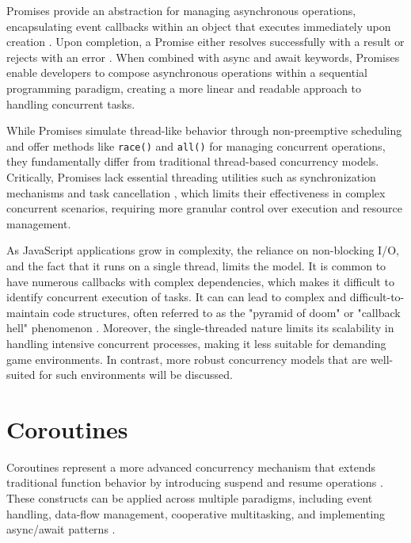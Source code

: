 \documentclass[]{final}
\begin{document}
Promises provide an abstraction for managing asynchronous operations,
encapsulating event callbacks within an object that executes
immediately upon creation \cite{zhao_concurrency_2021}.
Upon completion, a Promise either
resolves successfully with a result or rejects with an error
\cite{zhao_concurrency_2021}. When combined with async and await
keywords, Promises enable
developers to compose asynchronous operations within a
sequential programming paradigm, creating a more linear and
readable approach to handling concurrent tasks.

While Promises simulate thread-like behavior through non-preemptive scheduling
and offer methods like \lstinline|race()| and \lstinline|all()| for managing concurrent operations,
\cite{noauthor_event_2024} they fundamentally differ from traditional thread-based
concurrency models.
Critically, Promises lack essential threading utilities such as synchronization
mechanisms and task cancellation \cite{zhao_concurrency_2021}, which limits their effectiveness in
complex concurrent scenarios, requiring more granular control over execution
and resource management.

As JavaScript applications grow in complexity, the reliance on non-blocking
I/O, and the fact that it runs on a single thread,
limits the model. It
is common to have numerous callbacks with complex dependencies,
which makes it difficult to identify concurrent
execution of tasks.
It can can lead to complex and difficult-to-maintain code structures, often
referred to as the "pyramid of doom" or "callback hell" phenomenon \cite{belson_survey_2019, noauthor_callback_nodate}.
Moreover, the single-threaded nature limits its scalability in handling
intensive concurrent processes, making it less suitable for demanding game environments.
In contrast, more robust concurrency models that are well-suited for
such environments will be discussed.

\section{Coroutines}

\label{coroutines}

Coroutines represent a more advanced concurrency mechanism that extends
traditional function behavior by introducing suspend and resume operations \cite{belson_survey_2019}.
These  constructs can be applied across multiple paradigms, including event
handling, data-flow management, cooperative multitasking, and
implementing async/await patterns \cite{belson_survey_2019}.
\end{document}
